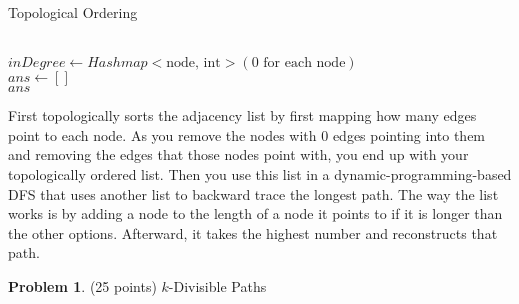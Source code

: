 \documentclass[11pt]{article}
\theoremstyle{definition}
\theoremstyle{theorem}
\newtheorem{prob}{Problem}
\begin{document}
\begin{algorithm}[H]
\caption{Topological Ordering}
 \\ {
    $inDegree \gets Hashmap<\text{node, int}>(0 \text{ for each node})$ \\
    $ans \gets []$ \\
    \Return $ans$
}
\end{algorithm}
First topologically sorts the adjacency list by first mapping how many edges point to each node. As you remove the nodes with 0 edges pointing into them and removing the edges that those nodes point with, you end up with your topologically ordered list. Then you use this list in a dynamic-programming-based DFS that uses another list to backward trace the longest path. The way the list works is by adding a node to the length of a node it points to if it is longer than the other options. Afterward, it takes the highest number and reconstructs that path.
\newpage

\begin{prob}{
(25 points) $k$-Divisible Paths}\end{prob}
\end{document}
